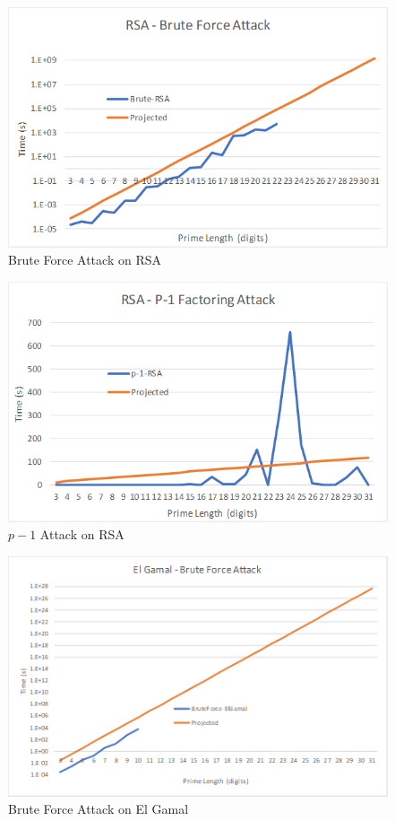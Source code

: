 \documentclass[12pt]{report}
\begin{document}
\begin{figure}[hp!] %
    \begin{center}
        \includegraphics[width=0.85\linewidth]{RSABrute.PNG}
        \caption{Brute Force Attack on RSA}
        \label{fig:rsa1}
    \end{center}
\end{figure}

\begin{figure}[hp!] %
    \begin{center}
        \includegraphics[width=0.85\linewidth]{RSAp-1.PNG}
        \caption{$p-1$ Attack on RSA}
        \label{fig:rsa2}
    \end{center}
\end{figure}

\begin{figure}[hp!] %
    \begin{center}
        \includegraphics[width=0.85\linewidth]{ElGamalBrute.PNG}
        \caption{Brute Force Attack on El Gamal}
        \label{fig:el-gamal1}
    \end{center}
\end{figure}
\end{document}

